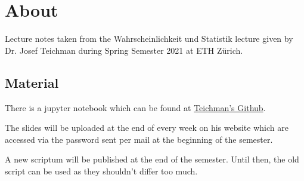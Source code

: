 \section*{About}

Lecture notes taken from the Wahrscheinlichkeit und Statistik lecture given by Dr. Josef Teichman during Spring Semester 2021 at ETH Zürich.

\subsection*{Material}

There is a jupyter notebook which can be found at \href{https://gist.github.com/jteichma/a9c2621e0a27faf1b8a885c039120778}{Teichman's Github}.

The slides will be uploaded at the end of every week on his website which are accessed via the password sent per mail at the beginning of the semester.

A new scriptum will be published at the end of the semester. Until then, the old script can be used as they shouldn't differ too much.

